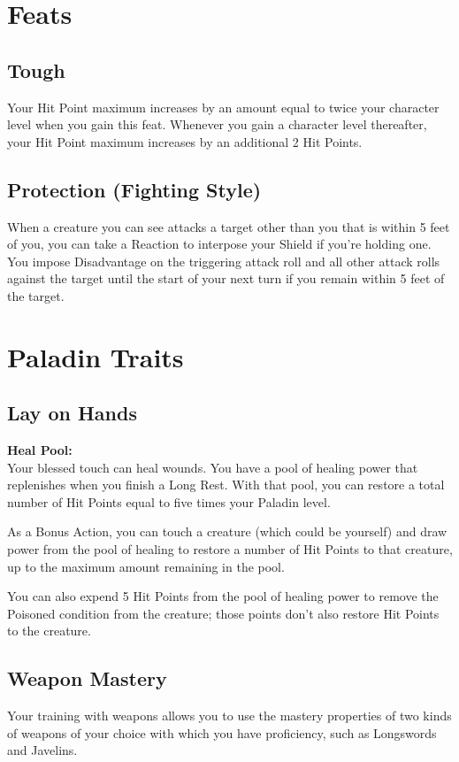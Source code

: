 \documentclass[letterpaper,openany,oneside,twocolumn]{book}
\begin{document}
\section*{Feats}
\subsection*{Tough}
Your Hit Point maximum increases by an amount equal to twice your character level when you gain this feat. Whenever you gain a character level thereafter, your Hit Point maximum increases by an additional 2 Hit Points.
\subsection*{Protection (Fighting Style)}
When a creature you can see attacks a target other than you that is within 5 feet of you, you can take a Reaction to interpose your Shield if you're holding one. You impose Disadvantage on the triggering attack roll and all other attack rolls against the target until the start of your next turn if you remain within 5 feet of the target.

\section*{Paladin Traits}
\subsection*{Lay on Hands}
\textbf{Heal Pool: }\\
Your blessed touch can heal wounds. You have a pool of healing power that replenishes when you finish a Long Rest. With that pool, you can restore a total number of Hit Points equal to five times your Paladin level.

As a Bonus Action, you can touch a creature (which could be yourself) and draw power from the pool of healing to restore a number of Hit Points to that creature, up to the maximum amount remaining in the pool.

You can also expend 5 Hit Points from the pool of healing power to remove the Poisoned condition from the creature; those points don't also restore Hit Points to the creature.
\subsection*{Weapon Mastery}
Your training with weapons allows you to use the mastery properties of two kinds of weapons of your choice with which you have proficiency, such as Longswords and Javelins.
\end{document}
